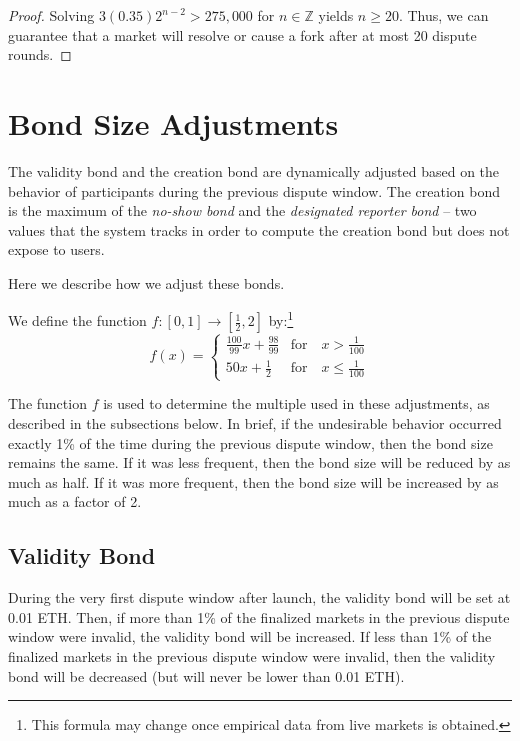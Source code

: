 \documentclass[floatfix,reprint,nofootinbib,amsmath,amssymb,epsfig,pre,floats,letterpaper,groupedaffiliation]{revtex4-1}
\newcommand{\beq}{\begin{equation}}
\newcommand{\eeq}{\end{equation}}
\theoremstyle{definition}
\theoremstyle{definition}
\begin{document}
\begin{appendix}
\begin{proof}
Solving $3(0.35)2^{n-2}>275,000$ for $n \in \mathbb{Z}$ yields $n \geq 20$.  Thus, we can guarantee that a market will resolve or cause a fork after at most 20 dispute rounds.
\end{proof}


\section{Bond Size Adjustments}\label{section:bond_size_adjustment_details}

The validity bond and the creation bond are dynamically adjusted based on the behavior of participants during the previous dispute window. The creation bond is the maximum of the \textit{no-show bond} and the \textit{designated reporter bond} -- two values that the system tracks in order to compute the creation bond but does not expose to users.

Here we describe how we adjust these bonds.

We define the function $f: [0, 1] \rightarrow [\frac{1}{2}, 2]$ by:\footnote{This formula may change once empirical data from live markets is obtained.}
\beq\label{eq:validity_bond_adjustment}
f(x) = \begin{cases} 
    \frac{100}{99} x + \frac{98}{99} & \text{for}\quad x > \frac{1}{100} \\
    50x + \frac{1}{2} & \text{for}\quad x \leq \frac{1}{100}
\end{cases}
\eeq

The function $f$ is used to determine the multiple used in these adjustments, as described in the subsections below. In brief, if the undesirable behavior occurred exactly 1\% of the time during the previous dispute window, then the bond size remains the same. If it was less frequent, then the bond size will be reduced by as much as half. If it was more frequent, then the bond size will be increased by as much as a factor of 2.

\subsection{Validity Bond}\label{section:bond_size_adjustment_details_validity_bonds}

During the very first dispute window after launch, the validity bond will be set at 0.01 ETH. Then, if more than 1\% of the finalized markets in the previous dispute window were invalid, the validity bond will be increased.  If less than 1\% of the finalized markets in the previous dispute window were invalid, then the validity bond will be decreased (but will never be lower than 0.01 ETH).


\end{appendix}
\end{document}
